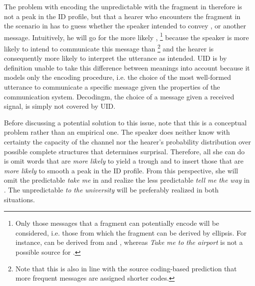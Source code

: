 The problem with encoding the unpredictable \Last[c] with the fragment in \Last[a] therefore is not a peak in the ID profile, but that a hearer who encounters the fragment in the scenario in \Last has to guess whether the speaker intended to convey \Last[b], \Last[c] or another message. Intuitively, he will go for the more likely \Last[b],%
% 
\footnote{Only those messages that a fragment can potentially encode will be considered, i.e. those from which the fragment can be derived by ellipsis. For instance, \Last[a] can be derived from \Last[b] and \Last[c], whereas \textit{Take me to the airport} is not a possible source for \Last[a].}\afterfn%
%
because the speaker is more likely to intend to communicate this message than \Last[c]%
%
\footnote{Note that this is also in line with the source coding-based prediction that more frequent messages are assigned shorter codes.}\afterfn%
%
and the hearer is consequently more likely to interpret the utterance as intended. UID is by definition unable to take this difference between meanings into account because it models only the encoding procedure, i.e. the choice of the most well-formed utterance to communicate a specific message given the properties of the communication system. Decodingm, the choice of a message given a received signal, is simply not covered by UID.

Before discussing a potential solution to this issue, note that this is a conceptual problem rather than an empirical one. The speaker does neither know with certainty the capacity of the channel nor the hearer's probability distribution over possible complete structures that determines surprisal. Therefore, all she can do is omit words that are \textit{more likely} to yield a trough and to insert those that are \textit{more likely} to smooth a peak in the ID profile. From this perspective, she will omit the predictable \textit{take me} in \Last[b] and realize the less predictable \textit{tell me the way} in \Last[c]. The unpredictable \textit{to the university} will be preferably realized in both situations.

